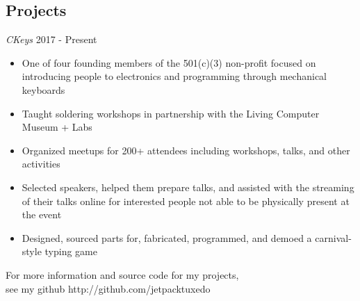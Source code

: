 \documentclass[line,margin]{res}
\newenvironment{tightcenter}{%
  \setlength\topsep{0pt}
  \setlength\parskip{0pt}
  \begin{center}
  }{\end{center}}
\begin{document}
\begin{resume}
  \section{\textcolor{TealBlue}{Projects}}
    {\sl CKeys} \hfill 2017 - Present
      \begin{itemize}  \itemsep -2pt %
        \item One of four founding members of the 501(c)(3) non-profit focused on introducing people to electronics and programming through mechanical keyboards
        \item Taught soldering workshops in partnership with the Living Computer Museum + Labs
        \item Organized meetups for 200+ attendees including workshops, talks, and other activities
        \item Selected speakers, helped them prepare talks, and assisted with the streaming of their talks online for interested people not able to be physically present at the event
        \item Designed, sourced parts for, fabricated, programmed, and demoed a carnival-style typing game
      \end{itemize}

\end{resume}

\vfill
\begin{tightcenter}
For more information and source code for my projects,\\
see my github http://github.com/jetpacktuxedo
\end{tightcenter}
\end{document}
